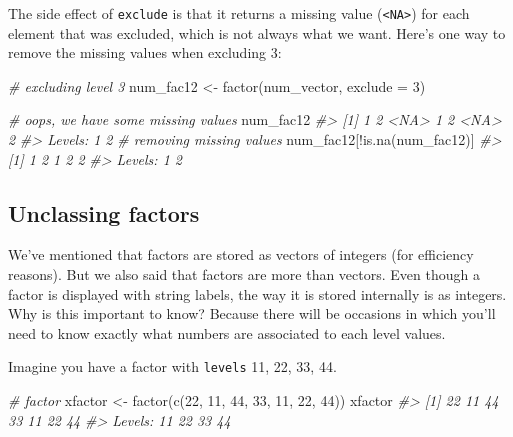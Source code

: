 \documentclass[
]{book}
\newenvironment{Shaded}{\begin{snugshade}}{\end{snugshade}}
\newcommand{\AttributeTok}[1]{\textcolor[rgb]{0.77,0.63,0.00}{#1}}
\newcommand{\CommentTok}[1]{\textcolor[rgb]{0.56,0.35,0.01}{\textit{#1}}}
\newcommand{\DecValTok}[1]{\textcolor[rgb]{0.00,0.00,0.81}{#1}}
\newcommand{\FunctionTok}[1]{\textcolor[rgb]{0.00,0.00,0.00}{#1}}
\newcommand{\NormalTok}[1]{#1}
\newcommand{\OtherTok}[1]{\textcolor[rgb]{0.56,0.35,0.01}{#1}}
\newcommand{\SpecialCharTok}[1]{\textcolor[rgb]{0.00,0.00,0.00}{#1}}
\begin{document}
The side effect of \texttt{exclude} is that it returns a missing value (\texttt{\textless{}NA\textgreater{}}) for
each element that was excluded, which is not always what we want. Here's one
way to remove the missing values when excluding 3:

\begin{Shaded}
\begin{Highlighting}[]
\CommentTok{\# excluding level 3}
\NormalTok{num\_fac12 }\OtherTok{\textless{}{-}} \FunctionTok{factor}\NormalTok{(num\_vector, }\AttributeTok{exclude =} \DecValTok{3}\NormalTok{)}

\CommentTok{\# oops, we have some missing values}
\NormalTok{num\_fac12}
\CommentTok{\#\textgreater{} [1] 1    2    \textless{}NA\textgreater{} 1    2    \textless{}NA\textgreater{} 2   }
\CommentTok{\#\textgreater{} Levels: 1 2}
\CommentTok{\# removing missing values}
\NormalTok{num\_fac12[}\SpecialCharTok{!}\FunctionTok{is.na}\NormalTok{(num\_fac12)]}
\CommentTok{\#\textgreater{} [1] 1 2 1 2 2}
\CommentTok{\#\textgreater{} Levels: 1 2}
\end{Highlighting}
\end{Shaded}

\hypertarget{unclassing-factors}{%
\subsection{Unclassing factors}\label{unclassing-factors}}

We've mentioned that factors are stored as vectors of integers (for efficiency
reasons). But we also said that factors are more than vectors. Even though a
factor is displayed with string labels, the way it is stored internally is as
integers. Why is this important to know? Because there will be occasions in
which you'll need to know exactly what numbers are associated to each level
values.

Imagine you have a factor with \texttt{levels} 11, 22, 33, 44.

\begin{Shaded}
\begin{Highlighting}[]
\CommentTok{\# factor}
\NormalTok{xfactor }\OtherTok{\textless{}{-}} \FunctionTok{factor}\NormalTok{(}\FunctionTok{c}\NormalTok{(}\DecValTok{22}\NormalTok{, }\DecValTok{11}\NormalTok{, }\DecValTok{44}\NormalTok{, }\DecValTok{33}\NormalTok{, }\DecValTok{11}\NormalTok{, }\DecValTok{22}\NormalTok{, }\DecValTok{44}\NormalTok{))}
\NormalTok{xfactor}
\CommentTok{\#\textgreater{} [1] 22 11 44 33 11 22 44}
\CommentTok{\#\textgreater{} Levels: 11 22 33 44}
\end{Highlighting}
\end{Shaded}
\end{document}
